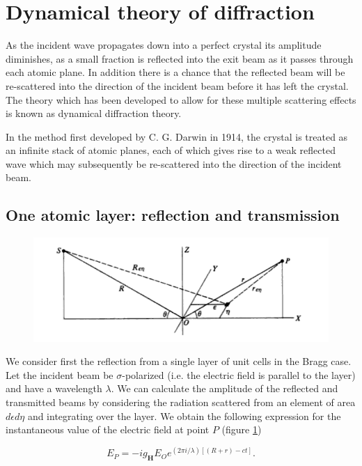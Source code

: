 \documentclass[12pt,oneside,notitlepage,abstracton,a4paper]{scrartcl}
\begin{document}
\section{Dynamical theory of diffraction}
As the incident wave propagates down into a perfect crystal its amplitude diminishes, as a small fraction is reflected into the exit beam as it passes through each atomic plane. In addition there is a chance that the reflected beam will be re-scattered into the direction of the incident beam before it has left the crystal. The theory which has been developed to allow for these multiple scattering effects is known as dynamical diffraction theory.

In the method first developed by C. G. Darwin in 1914, the crystal is treated as an infinite stack of atomic planes, each of which gives rise to a weak reflected wave which may subsequently be re-scattered into the direction of the incident beam.


\subsection{One atomic layer: reflection and transmission}\label{onelayer}

\begin{figure}[h]
\begin{center}
\includegraphics[width=12cm]{pics/picture1.png}
\caption{}
\label{pic1}
\end{center}
\end{figure}

We consider first the reflection from a single layer of unit cells in the Bragg case. Let the incident beam be $\sigma$-polarized (i.e. the electric field is parallel to the layer) and have a wavelength $\lambda$. We can calculate the amplitude of the reflected and transmitted beams by considering the radiation scattered from an element of area $d\epsilon d\eta$ and integrating over the layer. We obtain the following expression for the instantaneous value of the electric field at point $P$ (figure \ref{pic1})

\begin{equation}
 E_P=-ig_\mathbf{H}E_Oe^{(2\pi i /\lambda)[(R+r)-ct]}.
\end{equation}
\end{document}
